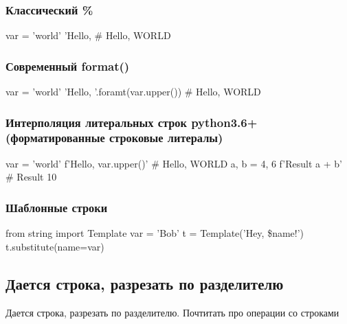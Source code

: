 \subsubsection{Классический \%}

\begin{python}
var = 'world'
'Hello, %
# Hello, WORLD
\end{python}

\subsubsection{Современный format()}

\begin{python}
var = 'world'
'Hello, {}'.foramt(var.upper())
# Hello, WORLD
\end{python}

\subsubsection{Интерполяция литеральных строк python3.6+ (форматированные строковые литералы)}

\begin{python}
var = 'world'
f'Hello, {var.upper()}'
# Hello, WORLD
a, b = 4, 6
f'Result {a + b}'
# Result 10
\end{python}

\subsubsection{Шаблонные строки}

\begin{python}
from string import Template
var = 'Bob'
t = Template('Hey, \$name!')
t.substitute(name=var)
\end{python}

\subsection{Дается строка, разрезать по разделителю}

	Дается строка, разрезать по разделителю. Почтитать про операции со строками

